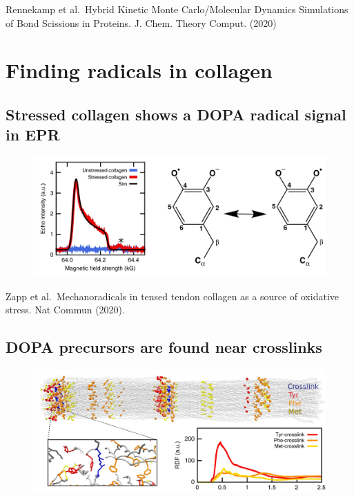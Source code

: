\documentclass[
  letterpaper,
  DIV=11,
  numbers=noendperiod]{scrartcl}
\begin{document}
Rennekamp et al.~Hybrid Kinetic Monte Carlo/Molecular Dynamics
Simulations of Bond Scissions in Proteins. J. Chem. Theory Comput.
(2020)

\hypertarget{finding-radicals-in-collagen}{%
\section{Finding radicals in
collagen}\label{finding-radicals-in-collagen}}

\hypertarget{stressed-collagen-shows-a-dopa-radical-signal-in-epr}{%
\subsection{Stressed collagen shows a DOPA radical signal in
EPR}\label{stressed-collagen-shows-a-dopa-radical-signal-in-epr}}

\begin{figure}

{\centering \includegraphics{www/DOPA_EPR.png}

}

\end{figure}

Zapp et al.~Mechanoradicals in tensed tendon collagen as a source of
oxidative stress. Nat Commun (2020).

\hypertarget{dopa-precursors-are-found-near-crosslinks}{%
\subsection{DOPA precursors are found near
crosslinks}\label{dopa-precursors-are-found-near-crosslinks}}

\begin{figure}

{\centering \includegraphics{www/DOPA_Modelling.png}

}

\end{figure}
\end{document}
